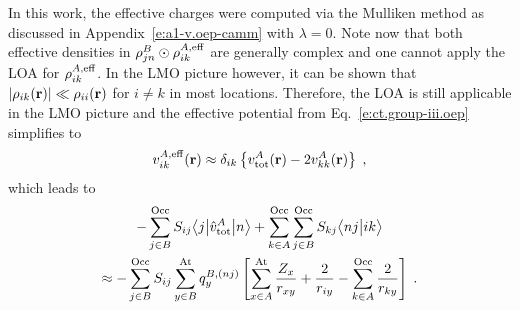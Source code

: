 \documentclass[aip,jcp,amsmath,amssymb,reprint,floatfix]{revtex4-1}
\begin{document}
%
In this work, the effective charges were computed via the Mulliken method as
discussed in Appendix~\ref{e:a1-v.oep-camm} with $\lambda=0$. 
Note now that both effective densities in 
$\rho^B_{jn} \odot \rho^{A,{\rm eff}}_{ik}$ are generally complex and one cannot apply the LOA
for $\rho^{A,{\rm eff}}_{ik}$. 
In the LMO picture however, it can be shown that
$\lvert\rho_{ik} ({\bf r}) \rvert \ll \rho_{ii} ({\bf r}) $ 
for $i\ne k$ in most locations. Therefore,
the LOA is still applicable in the LMO picture
and the effective potential from Eq.~\eqref{e:ct.group-iii.oep} 
simplifies to
%
\begin{equation} \label{e:ct.group-iii.oep.simplified}
 {v}^{A,{\rm eff}}_{ik}({\bf r}) \approx
 \delta_{ik} \left\{
 {v}^A_{\rm tot} ({\bf r})- 2{v}^A_{kk} ({\bf r}) \right\} \;,
\end{equation}
%
which
leads to 
%
\begin{multline} \label{e:ct.group-iii.final.b}
        - \sum_{j\in B}^{\rm Occ} S_{ij} \bigl\langle {j} \bigl\lvert {\hat{v}^A_{\rm tot} } \bigl\lvert {n} \bigr\rangle  
     + \sum_{k\in A}^{\rm Occ} \sum_{j\in B}^{\rm Occ}  
        S_{kj}
        \bigl\langle {nj} \bigl\lvert {ik} \bigr\rangle  \\
 \approx  -
 \sum_{j\in B}^{\rm Occ} S_{ij}
 \sum_{y\in B}^{\rm At} 
 q^{B,(nj)}_{y} 
 \left[ 
   \sum_{x\in A}^{\rm At}
   \frac{Z_x}{r_{xy}}
  + \frac{2}{r_{iy}}
  - \sum_{k\in A}^{\rm Occ}
    \frac{2}{r_{ky}} 
 \right]
 \;.
\end{multline}
%
\end{document}
